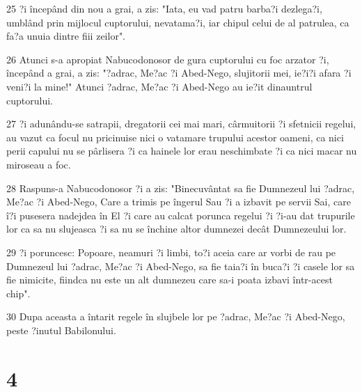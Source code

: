 \par 25 ?i începând din nou a grai, a zis: "Iata, eu vad patru barba?i dezlega?i, umblând prin mijlocul cuptorului, nevatama?i, iar chipul celui de al patrulea, ca fa?a unuia dintre fiii zeilor".
\par 26 Atunci s-a apropiat Nabucodonosor de gura cuptorului cu foc arzator ?i, începând a grai, a zis: "?adrac, Me?ac ?i Abed-Nego, slujitorii mei, ie?i?i afara ?i veni?i la mine!" Atunci ?adrac, Me?ac ?i Abed-Nego au ie?it dinauntrul cuptorului.
\par 27 ?i adunându-se satrapii, dregatorii cei mai mari, cârmuitorii ?i sfetnicii regelui, au vazut ca focul nu pricinuise nici o vatamare trupului acestor oameni, ca nici perii capului nu se pârlisera ?i ca hainele lor erau neschimbate ?i ca nici macar nu miroseau a foc.
\par 28 Raspuns-a Nabucodonosor ?i a zis: "Binecuvântat sa fie Dumnezeul lui ?adrac, Me?ac ?i Abed-Nego, Care a trimis pe îngerul Sau ?i a izbavit pe servii Sai, care î?i pusesera nadejdea în El ?i care au calcat porunca regelui ?i ?i-au dat trupurile lor ca sa nu slujeasca ?i sa nu se închine altor dumnezei decât Dumnezeului lor.
\par 29 ?i poruncesc: Popoare, neamuri ?i limbi, to?i aceia care ar vorbi de rau pe Dumnezeul lui ?adrac, Me?ac ?i Abed-Nego, sa fie taia?i în buca?i ?i casele lor sa fie nimicite, fiindca nu este un alt dumnezeu care sa-i poata izbavi într-acest chip".
\par 30 Dupa aceasta a întarit regele în slujbele lor pe ?adrac, Me?ac ?i Abed-Nego, peste ?inutul Babilonului.

\chapter{4}

